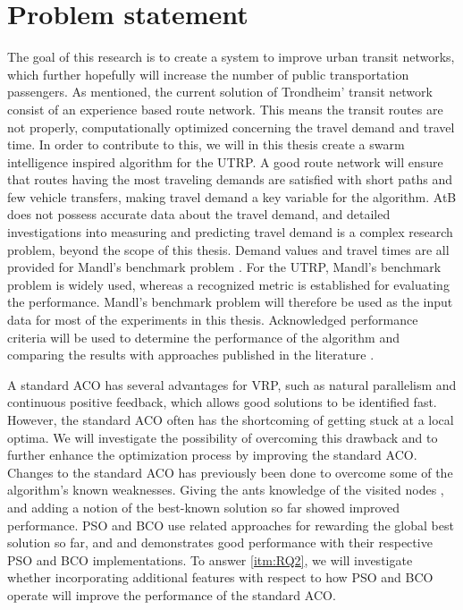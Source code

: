 \section{Problem statement}
\label{subsec:problemStatement}

The goal of this research is to create a system to improve urban transit networks, which further hopefully will increase the number of public transportation passengers. As mentioned, the current solution of Trondheim' transit network consist of an experience based route network. This means the transit routes are not properly, computationally optimized concerning the travel demand and travel time. In order to contribute to this, we will in this thesis create a swarm intelligence inspired algorithm for the UTRP. A good route network will ensure that routes having the most traveling demands are satisfied with short paths and few vehicle transfers, making travel demand a key variable for the algorithm. AtB \citep{website:atb} does not possess accurate data about the travel demand, and detailed investigations into measuring and predicting travel demand is a complex research problem, beyond the scope of this thesis. Demand values and travel times are all provided for Mandl's benchmark problem \citep{mandl79}. For the UTRP, Mandl's benchmark problem is widely used, whereas a recognized metric is established for evaluating the performance. Mandl's benchmark problem will therefore be used as the input data for most of the experiments in this thesis. Acknowledged performance criteria will be used to determine the performance of the algorithm and comparing the results with approaches published in the literature \citep{nikolic14,kechagiopoulos14,mandl79,kidwai98, fan10, chakroborty02, zhang10, chew12}.

A standard ACO has several advantages for VRP, such as natural parallelism and continuous positive feedback, which allows good solutions to be identified fast. However, the standard ACO often has the shortcoming  of getting stuck at a local optima. We will investigate the possibility of overcoming this drawback and to further enhance the optimization process by improving the standard ACO. Changes to the standard ACO has previously been done to overcome some of the algorithm's known weaknesses. Giving the ants knowledge of the visited nodes \citep{sedighpour14,salehinejad10,poorzahedy11}, and adding a notion of the best-known solution so far \citep{tripathi09,sedighpour14} showed improved performance. PSO and BCO use related approaches for rewarding the global best solution so far, and \citet{kechagiopoulos14} and \citet{nikolic14} demonstrates good performance with their respective PSO and BCO implementations. To answer \vref{itm:RQ2}, we will investigate whether incorporating additional features with respect to how PSO and BCO operate will improve the performance of the standard ACO.

